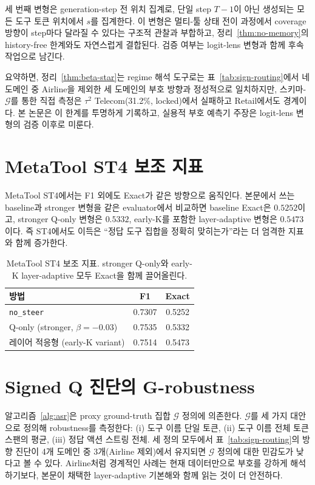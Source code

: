 세 번째 변형은 generation-step 전 위치 집계로, 단일 step $T{-}1$이 아닌 생성되는 모든 도구 토큰 위치에서 $s$를 집계한다. 이 변형은 멀티-툴 상태 전이 과정에서 coverage 방향이 step마다 달라질 수 있다는 구조적 관찰과 부합하고, 정리~\ref{thm:no-memory}의 history-free 한계와도 자연스럽게 결합된다. 검증 여부는 logit-lens 변형과 함께 후속 작업으로 남긴다.

요약하면, 정리~\ref{thm:beta-star}는 regime 해석 도구로는 표~\ref{tab:sign-routing}에서 네 도메인 중 Airline을 제외한 세 도메인의 부호 방향과 정성적으로 일치하지만, 스키마-$\mathcal{G}$를 통한 직접 측정은 $\tau^2$ Telecom(31.2\%, locked)에서 실패하고 Retail에서도 경계이다. 본 논문은 이 한계를 투명하게 기록하고, 실용적 부호 예측기 주장은 logit-lens 변형의 검증 이후로 미룬다.

\section{MetaTool ST4 보조 지표}\label{app:multi-metric-st4}

MetaTool ST4에서는 F1 외에도 Exact가 같은 방향으로 움직인다. 본문에서 쓰는 baseline과 stronger 변형을 같은 evaluator에서 비교하면 baseline Exact은 $0.5252$이고, stronger Q-only 변형은 $0.5332$, early-K를 포함한 layer-adaptive 변형은 $0.5473$이다. 즉 ST4에서도 이득은 ``정답 도구 집합을 정확히 맞히는가''라는 더 엄격한 지표와 함께 증가한다.

\begin{table}[h]
\centering
\caption{MetaTool ST4 보조 지표. stronger Q-only와 early-K layer-adaptive 모두 Exact을 함께 끌어올린다.}
\label{tab:st4-aux}
\small
\begin{tabularx}{0.78\linewidth}{@{}Xcc@{}}
\toprule
방법 & F1 & Exact \\
\midrule
\texttt{no\_steer} & 0.7307 & 0.5252 \\
Q-only (stronger, $\beta=-0.03$) & 0.7535 & 0.5332 \\
레이어 적응형 (early-K variant) & 0.7514 & 0.5473 \\
\bottomrule
\end{tabularx}
\end{table}

\section{Signed Q 진단의 G-robustness}\label{app:asr-fallback}\label{app:G-robustness}

알고리즘~\ref{alg:asr}은 proxy ground-truth 집합 $\mathcal{G}$ 정의에 의존한다. $\mathcal{G}$를 세 가지 대안으로 정의해 robustness를 측정한다: (i) 도구 이름 단일 토큰, (ii) 도구 이름 전체 토큰 스팬의 평균, (iii) 정답 액션 스트링 전체. 세 정의 모두에서 표~\ref{tab:sign-routing}의 방향 진단이 4개 도메인 중 3개(Airline 제외)에서 유지되면 $\mathcal{G}$ 정의에 대한 민감도가 낮다고 볼 수 있다. Airline처럼 경계적인 사례는 현재 데이터만으로 부호를 강하게 해석하기보다, 본문이 채택한 layer-adaptive 기본해와 함께 읽는 것이 더 안전하다.

